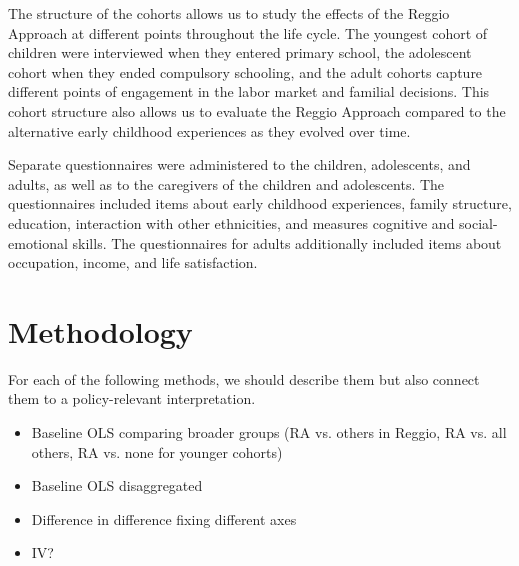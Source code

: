 \begin{table}[H]
\centering
{}
\end{table}

The structure of the cohorts allows us to study the effects of the Reggio Approach at different points throughout the life cycle. The youngest cohort of children were interviewed when they entered primary school, the adolescent cohort when they ended compulsory schooling, and the adult cohorts capture different points of engagement in the labor market and familial decisions. This cohort structure also allows us to evaluate the Reggio Approach compared to the alternative early childhood experiences as they evolved over time.

Separate questionnaires were administered to the children, adolescents, and adults, as well as to the caregivers of the children and adolescents. The questionnaires included items about early childhood experiences, family structure, education, interaction with other ethnicities, and measures cognitive and social-emotional skills. The questionnaires for adults additionally included items about occupation, income, and life satisfaction. 

\section{Methodology}
\label{sec:methodology}
For each of the following methods, we should describe them but also connect them to a policy-relevant interpretation.

\begin{itemize}
\item Baseline OLS comparing broader groups (RA vs. others in Reggio, RA vs. all others, RA vs. none for younger cohorts)
\item Baseline OLS disaggregated
\item Difference in difference fixing different axes
\item IV? 
\end{itemize}


